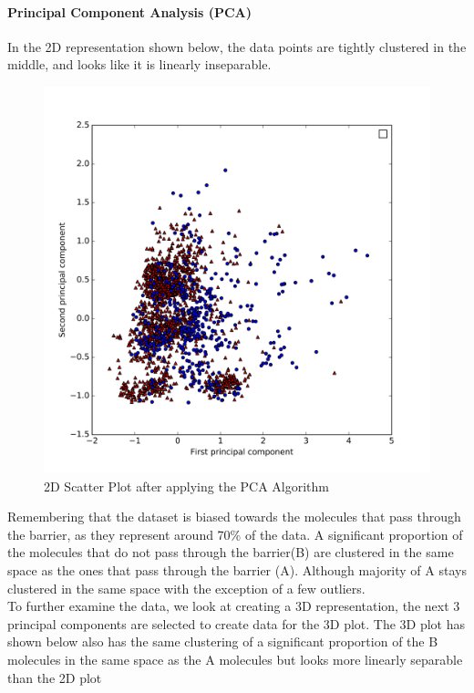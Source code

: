 \documentclass[a4paper,12pt]{report}
\begin{document}
			\paragraph{Principal Component Analysis (PCA)} 
			In the 2D representation shown below, the data points are tightly clustered in the middle, and looks like it is linearly inseparable.
				\begin{figure}[H]
					\centering
					\includegraphics[width=\textwidth,scale=1,totalheight=0.5\textheight]{images/scatter_pca}
					\caption{2D Scatter Plot after applying the PCA Algorithm}
					\label{fig:scatter_pca_2D}
				\end{figure}
			Remembering that the dataset is biased towards the molecules that pass through the barrier, as they represent around 70\% of the data. A significant proportion of the molecules that do not pass through the barrier(B) are clustered in the same space as the ones that pass through the barrier (A). Although majority of A stays clustered in the same space with the exception of a few outliers.\\
			To further examine the data, we look at creating a 3D representation, the next 3 principal components are selected to create data for the 3D plot. The 3D plot has shown below also has the same clustering of a significant proportion of the B molecules in the same space as the A molecules but looks more linearly separable than the 2D plot
\end{document}

